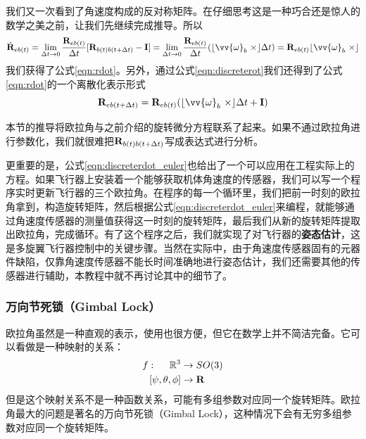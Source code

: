\documentclass[11pt]{article}
\begin{document}
我们又一次看到了角速度构成的反对称矩阵。在仔细思考这是一种巧合还是惊人的数学之美之前，让我们先继续完成推导。所以
$$
\dot{{\bf R}}_{eb(t)} = 
\lim_{\Delta t \to 0}\frac{{\bf R}_{eb(t)}}{\Delta t}[{\bf R}_{b(t)b(t+\Delta t)} - {\bf I}] 
=
\lim_{\Delta t \to 0}\frac{{\bf R}_{eb(t)}}{\Delta t}(\lfloor \vv{\omega}_b \ \times \rfloor \Delta t)
=
{\bf R}_{eb(t)}\lfloor \vv{\omega}_b \ \times \rfloor
$$
我们获得了公式\ref{eqn:rdot}。另外，通过公式\ref{eqn:discreterot}我们还得到了公式\ref{eqn:rdot}的一个离散化表示形式
\begin{equation}\label{eqn:discreterdot_euler}
{\bf R}_{eb(t+\Delta t)} = {\bf R}_{eb(t)}(\lfloor \vv{\omega}_b \ \times \rfloor \Delta t + {\bf I})
\end{equation}

本节的推导将欧拉角与之前介绍的旋转微分方程联系了起来。如果不通过欧拉角进行参数化，我们就很难把${\bf R}_{b(t)b(t+\Delta t)}$写成表达式进行分析。

更重要的是，公式\ref{eqn:discreterdot_euler}也给出了一个可以应用在工程实际上的方程。如果飞行器上安装着一个能够获取机体角速度的传感器，我们可以写一个程序实时更新飞行器的三个欧拉角。在程序的每一个循环里，我们把前一时刻的欧拉角拿到，构造旋转矩阵，然后根据公式\ref{eqn:discreterdot_euler}来编程，就能够通过角速度传感器的测量值获得这一时刻的旋转矩阵，最后我们从新的旋转矩阵提取出欧拉角，完成循环。有了这个程序之后，我们就实现了对飞行器的\textbf{姿态估计}，这是多旋翼飞行器控制中的关键步骤。当然在实际中，由于角速度传感器固有的元器件缺陷，仅靠角速度传感器不能长时间准确地进行姿态估计，我们还需要其他的传感器进行辅助，本教程中就不再讨论其中的细节了。
\subsubsection{万向节死锁（Gimbal Lock）}
欧拉角虽然是一种直观的表示，使用也很方便，但它在数学上并不简洁完备。它可以看做是一种映射的关系：
\begin{align*}
 f: \ \ \ \ \mathbb{R}^3 & \rightarrow SO(3) \\
	[\psi, \theta, \phi] & \rightarrow {\bf R}	
\end{align*}
但是这个映射关系不是一种函数关系，可能有多组参数对应同一个旋转矩阵。欧拉角最大的问题是著名的万向节死锁（Gimbal Lock），这种情况下会有无穷多组参数对应同一个旋转矩阵。
\end{document}

